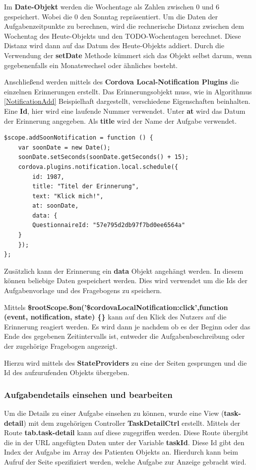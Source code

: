 Im \textbf{Date-Objekt} werden die Wochentage als Zahlen zwischen 0 und 6 gespeichert. Wobei die 0 den Sonntag repräsentiert.
Um die Daten der Aufgabenzeitpunkte zu berechnen, wird die rechnerische Distanz zwischen dem Wochentag des Heute-Objekts und den TODO-Wochentagen berechnet.
Diese Distanz wird dann auf das Datum des Heute-Objekts addiert. Durch die Verwendung der \textbf{setDate} Methode kümmert sich das Objekt selbst darum, wenn gegebenenfalls ein Monatswechsel oder ähnliches besteht.

Anschließend werden mittels des \textbf{Cordova Local-Notification Plugins} die einzelnen Erinnerungen erstellt. Das Erinnerungsobjekt muss, wie in Algorithmus \ref{NotificationAdd} Beispielhaft dargestellt, verschiedene Eigenschaften beinhalten. Eine \textbf{Id}, hier wird eine laufende Nummer verwendet. Unter \textbf{at} wird das Datum der Erinnerung angegeben.
Als \textbf{title} wird der Name der Aufgabe verwendet.

\begin{lstlisting}[caption={Beispiel einer Funktion zum hinzufügen einer Betriebssystemerinnerung},label=NotificationAdd]
$scope.addSoonNotification = function () {
	var soonDate = new Date();
	soonDate.setSeconds(soonDate.getSeconds() + 15);
	cordova.plugins.notification.local.schedule({
		id: 1987,
		title: "Titel der Erinnerung",
		text: "Klick mich!",
		at: soonDate,
		data: {
		QuestionnaireId: "57e795d2db97f7bd0ee6564a"
	}
	});
};
\end{lstlisting}

Zusätzlich kann der Erinnerung  ein \textbf{data} Objekt angehängt werden. In diesem können beliebige Daten gespeichert werden. Dies wird verwendet um die Ids der Aufgabenvorlage und des Fragebogens zu speichern. 

Mittels \textbf{\$rootScope.\$on('\$cordovaLocalNotification:click',function (event, notification, state) \{\}} kann auf den Klick des Nutzers auf die Erinnerung reagiert werden. Es wird dann je nachdem ob es der Beginn oder das Ende des gegebenen Zeitintervalls ist, entweder die Aufgabenbeschreibung oder der zugehörige Fragebogen angezeigt.

Hierzu wird mittels des \textbf{StateProviders} zu eine der Seiten gesprungen und die Id des aufzurufenden Objekts übergeben.

\subsubsection{Aufgabendetails einsehen und bearbeiten}
Um die Details zu einer Aufgabe einsehen zu können, wurde eine View (\textbf{task-detail}) mit dem zugehörigen Controller \textbf{TaskDetailCtrl} erstellt. Mittels der Route \textbf{tab.task-detail} kann auf diese zugegriffen werden. Diese Route übergibt die in der URL angefügten Daten unter der Variable \textbf{taskId}. Diese Id gibt den Index der Aufgabe im Array des Patienten Objekts an. Hierdurch kann beim Aufruf der Seite spezifiziert werden, welche Aufgabe zur Anzeige gebracht wird.

